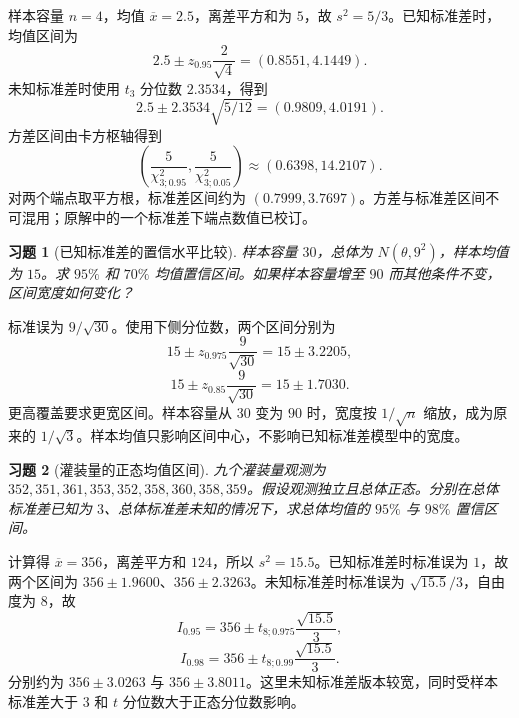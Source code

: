 \documentclass[UTF8,12pt,a4paper,fontset=fandol]{ctexart}
\newtheorem{exercise}{习题}[section]
\begin{document}
\begin{solve}\label{a:M-C22-1}样本容量 $n=4$，均值 $\overline x=2.5$，离差平方和为 $5$，故 $s^2=5/3$。已知标准差时，均值区间为\[2.5\pm z_{0.95}\frac2{\sqrt4}=(0.8551,4.1449).\]未知标准差时使用 $t_3$ 分位数 $2.3534$，得到\[2.5\pm2.3534\sqrt{5/12}=(0.9809,4.0191).\]方差区间由卡方枢轴得到\[\left(\frac5{\chi^2_{3;0.95}},\frac5{\chi^2_{3;0.05}}\right)\approx(0.6398,14.2107).\]对两个端点取平方根，标准差区间约为 $(0.7999,3.7697)$。方差与标准差区间不可混用；原解中的一个标准差下端点数值已校订。\end{solve}

\begin{exercise}[已知标准差的置信水平比较]\label{q:M-P10-1}
样本容量 $30$，总体为 $N(\theta,9^2)$，样本均值为 $15$。求 $95\%$ 和 $70\%$ 均值置信区间。如果样本容量增至 $90$ 而其他条件不变，区间宽度如何变化？\par{}
\end{exercise}

\begin{solve}\label{a:M-P10-1}标准误为 $9/\sqrt{30}$。使用下侧分位数，两个区间分别为\[15\pm z_{0.975}\frac9{\sqrt{30}}=15\pm3.2205,\]\[15\pm z_{0.85}\frac9{\sqrt{30}}=15\pm1.7030.\]更高覆盖要求更宽区间。样本容量从 $30$ 变为 $90$ 时，宽度按 $1/\sqrt n$ 缩放，成为原来的 $1/\sqrt3$。样本均值只影响区间中心，不影响已知标准差模型中的宽度。\end{solve}

\begin{exercise}[灌装量的正态均值区间]\label{q:M-P10-2}
九个灌装量观测为 $352,351,361,353,352,358,360,358,359$。假设观测独立且总体正态。分别在总体标准差已知为 $3$、总体标准差未知的情况下，求总体均值的 $95\%$ 与 $98\%$ 置信区间。\par{}
\end{exercise}

\begin{solve}\label{a:M-P10-2}计算得 $\overline x=356$，离差平方和 $124$，所以 $s^2=15.5$。已知标准差时标准误为 $1$，故两个区间为 $356\pm1.9600$、$356\pm2.3263$。未知标准差时标准误为 $\sqrt{15.5}/3$，自由度为 $8$，故\[I_{0.95}=356\pm t_{8;0.975}\frac{\sqrt{15.5}}3,\]\[I_{0.98}=356\pm t_{8;0.99}\frac{\sqrt{15.5}}3.\]分别约为 $356\pm3.0263$ 与 $356\pm3.8011$。这里未知标准差版本较宽，同时受样本标准差大于 $3$ 和 $t$ 分位数大于正态分位数影响。\end{solve}
\end{document}
